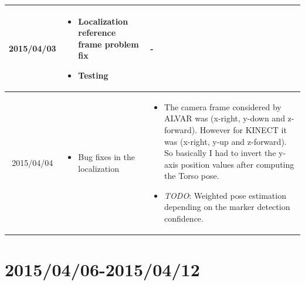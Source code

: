 \documentclass[11pt]{article} %
\begin{document}
\begin{center}
\begin{longtable}{ | c | p{6cm} | p{5cm} |}
  2015/04/03         & 
  \begin{itemize}
  \item Localization reference frame problem fix
  \item Testing
\end{itemize}   
  & 
  -
\\
  										 \hline
  										 
	 2015/04/04         & 
  \begin{itemize}
  \item Bug fixes in the localization
\end{itemize}   
  & 
\begin{itemize}
  \item The camera frame considered by ALVAR was (x-right, y-down and z-forward). However for KINECT it was (x-right, y-up and z-forward). So basically I had to invert the y-axis position values after computing the Torso pose.
  \item \emph{TODO}: Weighted pose estimation depending on the marker detection confidence.
\end{itemize}  		\\					 \hline  	

										 
  										   								 
    \end{longtable}
\end{center}

\newpage
\section{2015/04/06-2015/04/12}
\end{document}
